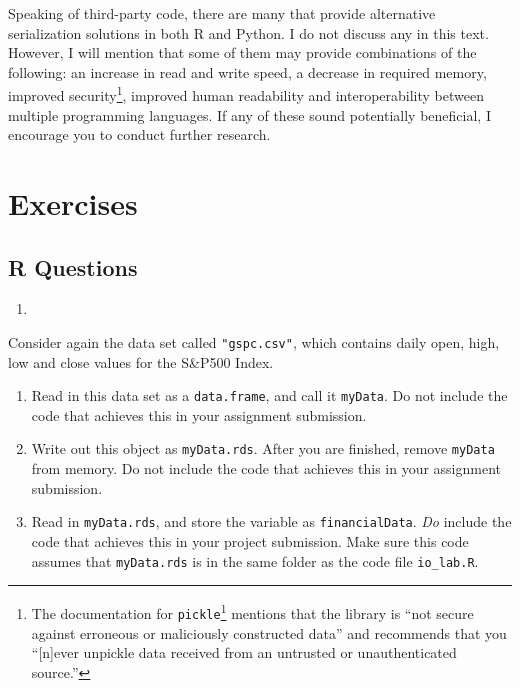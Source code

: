 \documentclass[
  12pt,
  krantz2]{krantz}
\providecommand{\tightlist}{%
  \setlength{\itemsep}{0pt}\setlength{\parskip}{0pt}}
\renewcommand{\href}[2]{#2\footnote{\url{#1}}}
\begin{document}
Speaking of third-party code, there are many that provide alternative serialization solutions in both R and Python. I do not discuss any in this text. However, I will mention that some of them may provide combinations of the following: an increase in read and write speed, a decrease in required memory, improved security\footnote{The \href{https://docs.python.org/2/library/pickle.html}{documentation for \texttt{pickle}} mentions that the library is ``not secure against erroneous or maliciously constructed data'' and recommends that you ``{[}n{]}ever unpickle data received from an untrusted or unauthenticated source.''}, improved human readability and interoperability between multiple programming languages. If any of these sound potentially beneficial, I encourage you to conduct further research.

\hypertarget{exercises-7}{%
\section{Exercises}\label{exercises-7}}

\hypertarget{r-questions-7}{%
\subsection{R Questions}\label{r-questions-7}}

\begin{enumerate}
\def\labelenumi{\arabic{enumi}.}
\tightlist
\item
\end{enumerate}

Consider again the data set called \texttt{"gspc.csv"}, which contains daily open, high, low and close values for the S\&P500 Index.

\begin{enumerate}
\def\labelenumi{\alph{enumi})}
\tightlist
\item
  Read in this data set as a \texttt{data.frame}, and call it \texttt{myData}. Do not include the code that achieves this in your assignment submission.
\item
  Write out this object as \texttt{myData.rds}. After you are finished, remove \texttt{myData} from memory. Do not include the code that achieves this in your assignment submission.
\item
  Read in \texttt{myData.rds}, and store the variable as \texttt{financialData}. \emph{Do} include the code that achieves this in your project submission. Make sure this code assumes that \texttt{myData.rds} is in the same folder as the code file \texttt{io\_lab.R}.
\end{enumerate}
\end{document}
